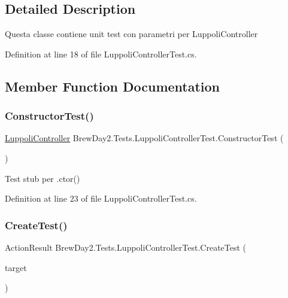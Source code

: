\subsection{Detailed Description}
Questa classe contiene unit test con parametri per Luppoli\+Controller



Definition at line 18 of file Luppoli\+Controller\+Test.\+cs.



\subsection{Member Function Documentation}
\mbox{\label{class_brew_day2_1_1_tests_1_1_luppoli_controller_test_a9c67a50021427183676b63d405386e43}} 
\subsubsection{\texorpdfstring{Constructor\+Test()}{ConstructorTest()}}
{\footnotesize\ttfamily \mbox{\hyperlink{class_brew_day2_1_1_controllers_1_1_luppoli_controller}{Luppoli\+Controller}} Brew\+Day2.\+Tests.\+Luppoli\+Controller\+Test.\+Constructor\+Test (\begin{DoxyParamCaption}{ }\end{DoxyParamCaption})}



Test stub per .ctor()



Definition at line 23 of file Luppoli\+Controller\+Test.\+cs.

\mbox{\label{class_brew_day2_1_1_tests_1_1_luppoli_controller_test_acafca0d4a5a48475cded38d19039c11f}} 
\subsubsection{\texorpdfstring{Create\+Test()}{CreateTest()}}
{\footnotesize\ttfamily Action\+Result Brew\+Day2.\+Tests.\+Luppoli\+Controller\+Test.\+Create\+Test (\begin{DoxyParamCaption}\item[{\mbox{[}\+Pex\+Assume\+Under\+Test\mbox{]} \mbox{\hyperlink{class_brew_day2_1_1_controllers_1_1_luppoli_controller}{Luppoli\+Controller}}}]{target }\end{DoxyParamCaption})}



